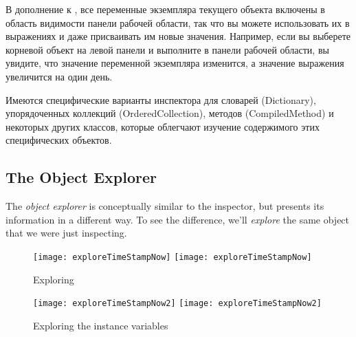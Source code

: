 \documentclass[a4paper,10pt,twoside]{book}
\begin{document}
В дополнение к , все переменные экземпляра текущего объекта включены в область видимости панели рабочей области, так что вы можете использовать их в выражениях и даже присваивать им новые значения. Например, если вы выберете корневой объект на левой панели и выполните  в панели рабочей области, вы увидите, что значение переменной экземпляра  изменится, а значение выражения  увеличится на один день.


Имеются специфические варианты инспектора для словарей (Dictionary), упорядоченных коллекций (OrderedCollection), методов (CompiledMethod) и некоторых других классов, которые облегчают изучение содержимого этих специфических объектов.


\subsection{The Object Explorer}

The \emph{object explorer} is conceptually similar to the inspector, but presents its information in a different way.
To see the difference, we'll \emph{explore} the same object that we were just inspecting.

\begin{figure}[tbp]
\begin{minipage}{0.48\textwidth}
	\begin{center}
	\ifluluelse
		{\texttt{[image: exploreTimeStampNow]}}
		{\texttt{[image: exploreTimeStampNow]}}
	\end{center}
	\caption{Exploring }
\end{minipage}
\hfill
\begin{minipage}{0.48\textwidth}
	\begin{center}
	\ifluluelse
		{\texttt{[image: exploreTimeStampNow2]}}
		{\texttt{[image: exploreTimeStampNow2]}}
	\end{center}
	\caption{Exploring the instance variables}
\end{minipage}
\end{figure}
\end{document}
